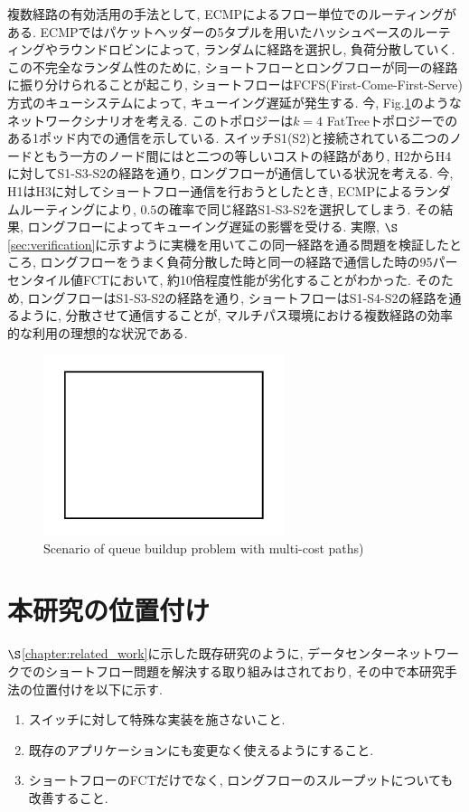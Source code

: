 複数経路の有効活用の手法として, ECMPによるフロー単位でのルーティングがある. 
ECMPではパケットヘッダーの5タプルを用いたハッシュベースのルーティングやラウンドロビンによって, ランダムに経路を選択し, 負荷分散していく. 
この不完全なランダム性のために, ショートフローとロングフローが同一の経路に振り分けられることが起こり,
ショートフローはFCFS(First-Come-First-Serve)方式のキューシステムによって, キューイング遅延が発生する. 
今, Fig.\ref{fig:repflow_scenario}のようなネットワークシナリオを考える. 
このトポロジーは$k=4$ FatTreeトポロジーでのある1ポッド内での通信を示している. 
スイッチS1(S2)と接続されている二つのノードともう一方のノード間にはと二つの等しいコストの経路があり, H2からH4に対してS1-S3-S2の経路を通り,
ロングフローが通信している状況を考える. 
今, H1はH3に対してショートフロー通信を行おうとしたとき, ECMPによるランダムルーティングにより,
$0.5$の確率で同じ経路S1-S3-S2を選択してしまう. 
その結果, ロングフローによってキューイング遅延の影響を受ける. 
実際, $\S$\ref{sec:verification}に示すように実機を用いてこの同一経路を通る問題を検証したところ,
ロングフローをうまく負荷分散した時と同一の経路で通信した時の95パーセンタイル値FCTにおいて,
約10倍程度性能が劣化することがわかった\cite{mptcp_ana2}.
そのため, ロングフローはS1-S3-S2の経路を通り, ショートフローはS1-S4-S2の経路を通るように, 分散させて通信することが,
マルチパス環境における複数経路の効率的な利用の理想的な状況である. 

\begin{figure}[t]
    \begin{center}
    \includegraphics[autoebb, width=200pt]{./img/test.pdf}
    \caption{Scenario of queue buildup problem with multi-cost paths)}
    \label{fig:repflow_scenario}
    \end{center}
\end{figure}


\section{本研究の位置付け}
\label{sec:myworks_position}
$\S$\ref{chapter:related_work}に示した既存研究のように, 
データセンターネットワークでのショートフロー問題を解決する取り組みはされており, その中で本研究手法の位置付けを以下に示す. 
\begin{enumerate}
\item スイッチに対して特殊な実装を施さないこと. 
\item 既存のアプリケーションにも変更なく使えるようにすること. 
\item ショートフローのFCTだけでなく, ロングフローのスループットについても改善すること. 
\end{enumerate} 

